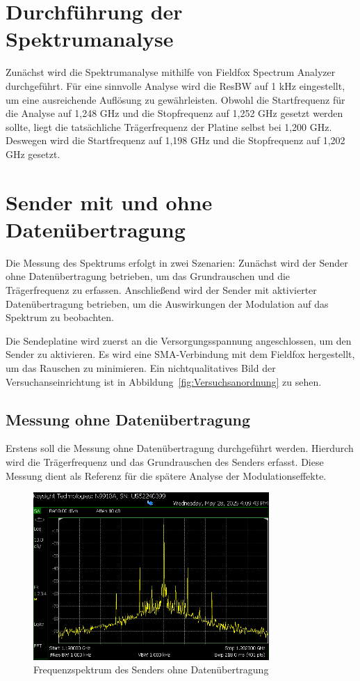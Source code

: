 \section{Durchführung der Spektrumanalyse}
Zunächst wird die Spektrumanalyse mithilfe von Fieldfox Spectrum Analyzer durchgeführt. Für eine sinnvolle Analyse wird die ResBW auf 1 kHz eingestellt, um eine ausreichende Auflösung zu gewährleisten.
Obwohl die Startfrequenz für die Analyse auf 1,248 GHz und die Stopfrequenz auf 1,252 GHz gesetzt werden sollte, liegt die tatsächliche Trägerfrequenz der Platine selbst bei 1,200 GHz. Deswegen wird die Startfrequenz auf 1,198 GHz und die Stopfrequenz auf 1,202 GHz gesetzt. 
\section{Sender mit und ohne Datenübertragung}
Die Messung des Spektrums erfolgt in zwei Szenarien: Zunächst wird der Sender ohne Datenübertragung betrieben, um das Grundrauschen und die Trägerfrequenz zu erfassen. Anschließend wird der Sender mit aktivierter Datenübertragung betrieben, um die Auswirkungen der Modulation auf das Spektrum zu beobachten.

Die Sendeplatine wird zuerst an die Versorgungsspannung angeschlossen, um den Sender zu aktivieren. Es wird eine SMA-Verbindung mit dem Fieldfox hergestellt, um das Rauschen zu minimieren. Ein nichtqualitatives Bild der Versuchanseinrichtung ist in Abbildung~\ref{fig:Versuchsanordnung} zu sehen.

    \subsection{Messung ohne Datenübertragung}
    Erstens soll die Messung ohne Datenübertragung durchgeführt werden. Hierdurch wird die Trägerfrequenz und das Grundrauschen des Senders erfasst. Diese Messung dient als Referenz für die spätere Analyse der Modulationseffekte.
    \begin{figure}[H]
        \centering
        \includegraphics[width=0.8\textwidth]{Pictures/4.4.png}
        \caption{Frequenzspektrum des Senders ohne Datenübertragung}
        \label{fig:OhneDaten}
    \end{figure}
